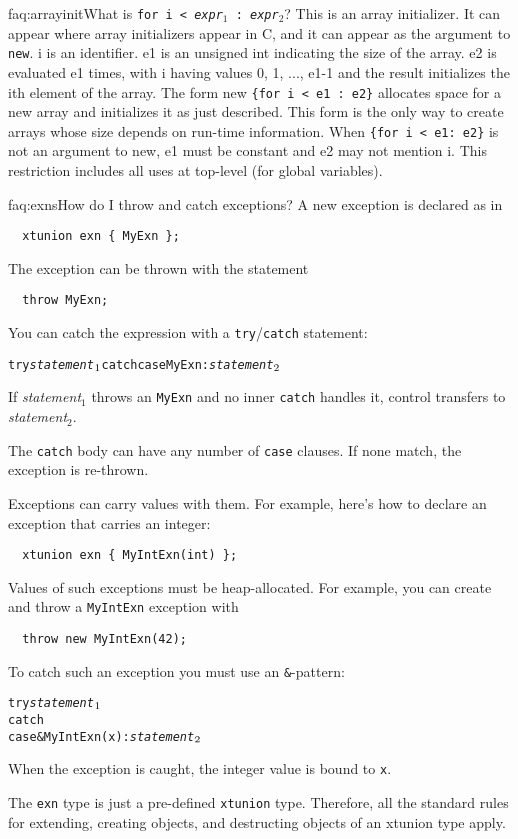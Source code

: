 \begin{faqa}{faq:arrayinit}{What is \texttt{\lb for i < {\it expr}$_1$ : {\it expr}$_2$\rb}?}
This is an array initializer.  It can appear where array
initializers appear in C, and it can appear as the argument to
\texttt{new}.
i
is an identifier.  e1 is an unsigned int indicating the size of the
array.  e2 is evaluated e1 times, with i having values 0, 1, ..., e1-1
and the result initializes the ith element of the array.  The form new
\texttt{\{for i < e1 : e2\}} allocates space for a new array and initializes it
as just described.  This form is the only way to create arrays whose
size depends on run-time information.  When \texttt{\{for i < e1:
e2\}} is not an argument to new, e1 must be constant and e2 may not
mention i.  This restriction includes all uses at top-level (for
global variables).
\end{faqa}

\begin{faqa}{faq:exns}{How do I throw and catch exceptions?}
A new exception is declared as in 
\begin{verbatim}
  xtunion exn { MyExn };
\end{verbatim}
The exception can be thrown with the statement
\begin{verbatim}
  throw MyExn;
\end{verbatim}
You can catch the expression with a \texttt{try}/\texttt{catch}
statement:
\begin{alltt}
  try {\it statement}\(\sb{1}\) catch \lb case MyExn: {\it statement}\(\sb{2}\) \rb
\end{alltt}
If {\it statement}$_1$ throws an \texttt{MyExn} and no inner
\texttt{catch} handles it, control transfers to 
{\it statement}$_2$.

The \texttt{catch} body can have any number of \texttt{case} clauses.
If none match, the exception is re-thrown.

Exceptions can carry values with them.  For example, here's how to
declare an exception that carries an integer:
\begin{verbatim}
  xtunion exn { MyIntExn(int) };
\end{verbatim}
Values of such exceptions must be heap-allocated.  For example, you
can create and throw a \texttt{MyIntExn} exception with
\begin{verbatim}
  throw new MyIntExn(42);
\end{verbatim}
To catch such an exception you must use an \texttt{\&}-pattern:
\begin{alltt}
  try {\it statement}\(\sb{1}\)
  catch \lb
    case &MyIntExn(x): {\it statement}\(\sb{2}\)
  \rb
\end{alltt}
When the exception is caught, the integer value is bound to \texttt{x}.

The \texttt{exn} type is just a pre-defined \texttt{xtunion} type.
Therefore, all the standard rules for extending, creating objects, and
destructing objects of an xtunion type apply.
\end{faqa}

